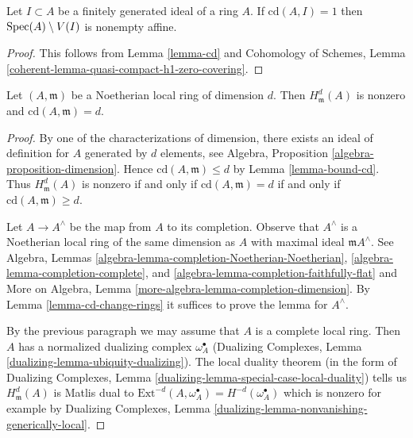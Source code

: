 \begin{lemma}
\label{lemma-cd-is-one}
Let $I \subset A$ be a finitely generated ideal of a ring $A$. If
$\text{cd}(A, I) = 1$ then $\mathop{\mathrm{Spec}}(A) \setminus V(I)$ is nonempty affine.
\end{lemma}

\begin{proof}
This follows from Lemma \ref{lemma-cd} and
Cohomology of Schemes, Lemma
\ref{coherent-lemma-quasi-compact-h1-zero-covering}.
\end{proof}

\begin{lemma}
\label{lemma-cd-maximal}
Let $(A, \mathfrak m)$ be a Noetherian local ring of dimension $d$.
Then $H^d_\mathfrak m(A)$ is nonzero and $\text{cd}(A, \mathfrak m) = d$.
\end{lemma}

\begin{proof}
By one of the characterizations of dimension, there exists
an ideal of definition for $A$ generated by $d$ elements, see
Algebra, Proposition \ref{algebra-proposition-dimension}.
Hence $\text{cd}(A, \mathfrak m) \leq d$ by
Lemma \ref{lemma-bound-cd}. Thus $H^d_\mathfrak m(A)$ is
nonzero if and only if $\text{cd}(A, \mathfrak m) = d$ if and only if
$\text{cd}(A, \mathfrak m) \geq d$.

\medskip\noindent
Let $A \to A^\wedge$ be the map from $A$ to its completion.
Observe that $A^\wedge$ is a Noetherian local ring of the
same dimension as $A$ with maximal ideal $\mathfrak m A^\wedge$.
See Algebra, Lemmas
\ref{algebra-lemma-completion-Noetherian-Noetherian},
\ref{algebra-lemma-completion-complete}, and
\ref{algebra-lemma-completion-faithfully-flat} and
More on Algebra, Lemma \ref{more-algebra-lemma-completion-dimension}.
By Lemma \ref{lemma-cd-change-rings}
it suffices to prove the lemma for $A^\wedge$.

\medskip\noindent
By the previous paragraph we may assume that $A$ is
a complete local ring. Then $A$ has a normalized dualizing complex
$\omega_A^\bullet$ (Dualizing Complexes, Lemma
\ref{dualizing-lemma-ubiquity-dualizing}).
The local duality theorem (in the form of
Dualizing Complexes, Lemma \ref{dualizing-lemma-special-case-local-duality})
tells us $H^d_\mathfrak m(A)$ is Matlis dual to
$\text{Ext}^{-d}(A, \omega_A^\bullet) = H^{-d}(\omega_A^\bullet)$
which is nonzero for example by
Dualizing Complexes, Lemma
\ref{dualizing-lemma-nonvanishing-generically-local}.
\end{proof}

